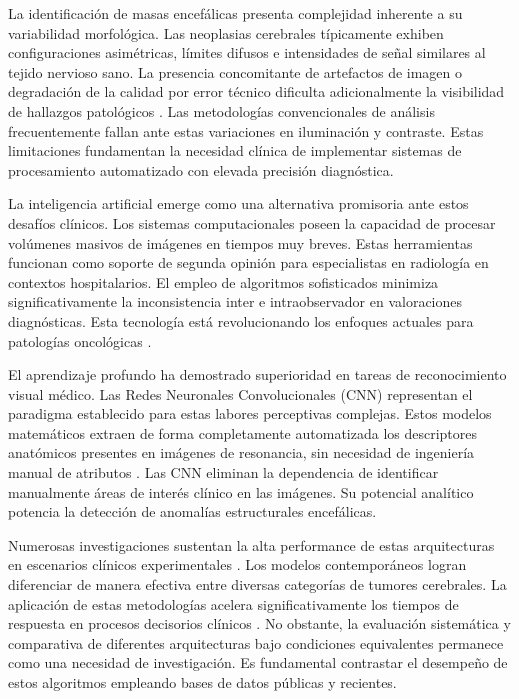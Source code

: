 La identificación de masas encefálicas presenta complejidad inherente a su variabilidad morfológica. Las neoplasias cerebrales típicamente exhiben configuraciones asimétricas, límites difusos e intensidades de señal similares al tejido nervioso sano. La presencia concomitante de artefactos de imagen o degradación de la calidad por error técnico dificulta adicionalmente la visibilidad de hallazgos patológicos \cite{Soomro2023}. Las metodologías convencionales de análisis frecuentemente fallan ante estas variaciones en iluminación y contraste. Estas limitaciones fundamentan la necesidad clínica de implementar sistemas de procesamiento automatizado con elevada precisión diagnóstica.

La inteligencia artificial emerge como una alternativa promisoria ante estos desafíos clínicos. Los sistemas computacionales poseen la capacidad de procesar volúmenes masivos de imágenes en tiempos muy breves. Estas herramientas funcionan como soporte de segunda opinión para especialistas en radiología en contextos hospitalarios. El empleo de algoritmos sofisticados minimiza significativamente la inconsistencia inter e intraobservador en valoraciones diagnósticas. Esta tecnología está revolucionando los enfoques actuales para patologías oncológicas \cite{Anantharajan2024}.

El aprendizaje profundo ha demostrado superioridad en tareas de reconocimiento visual médico. Las Redes Neuronales Convolucionales (CNN) representan el paradigma establecido para estas labores perceptivas complejas. Estos modelos matemáticos extraen de forma completamente automatizada los descriptores anatómicos presentes en imágenes de resonancia, sin necesidad de ingeniería manual de atributos \cite{Khan2022}. Las CNN eliminan la dependencia de identificar manualmente áreas de interés clínico en las imágenes. Su potencial analítico potencia la detección de anomalías estructurales encefálicas.

Numerosas investigaciones sustentan la alta performance de estas arquitecturas en escenarios clínicos experimentales \cite{Mahmud2023}. Los modelos contemporáneos logran diferenciar de manera efectiva entre diversas categorías de tumores cerebrales. La aplicación de estas metodologías acelera significativamente los tiempos de respuesta en procesos decisorios clínicos \cite{Dorfner2025}. No obstante, la evaluación sistemática y comparativa de diferentes arquitecturas bajo condiciones equivalentes permanece como una necesidad de investigación. Es fundamental contrastar el desempeño de estos algoritmos empleando bases de datos públicas y recientes.

